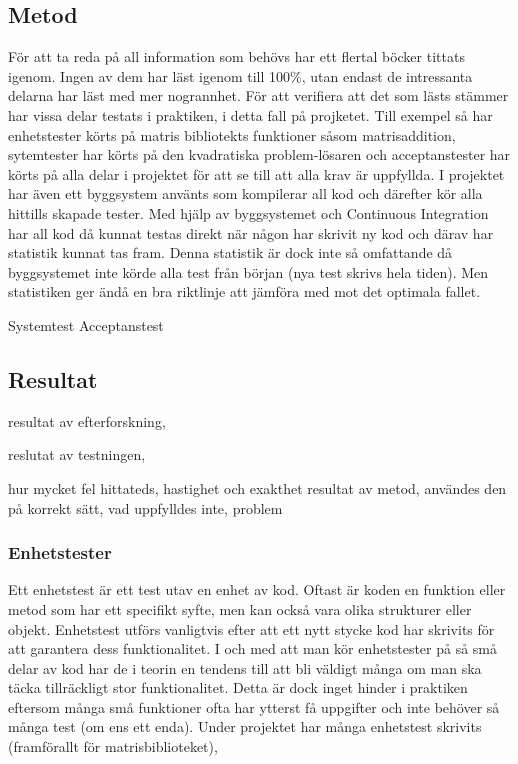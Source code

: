 	\subsection{Metod}
	För att ta reda på all information som behövs har ett flertal böcker tittats igenom. Ingen av dem har läst igenom till 100\%, utan endast de intressanta delarna har läst med mer nogrannhet. För att verifiera att det som lästs stämmer har vissa delar testats i praktiken, i detta fall på projketet. Till exempel så har enhetstester körts på matris bibliotekts funktioner såsom matrisaddition, sytemtester har körts på den kvadratiska problem-lösaren och acceptanstester har körts på alla delar i projektet för att se till att alla krav är uppfyllda.\newline
	I projektet har även ett byggsystem använts som kompilerar all kod och därefter kör alla hittills skapade tester. Med hjälp av byggsystemet och Continuous Integration har all kod då kunnat testas direkt när någon har skrivit ny kod och därav har statistik kunnat tas fram. Denna statistik är dock inte så omfattande då byggsystemet inte körde alla test från början (nya test skrivs hela tiden). Men statistiken ger ändå en bra riktlinje att jämföra med mot det optimala fallet.
	
	Systemtest
	Acceptanstest
	
	
	
	\subsection{Resultat}	
	resultat av efterforskning, \newline
	
	reslutat av testningen, \newline
	
	
	hur mycket fel hittateds, \newline
	hastighet och exakthet\newline
	resultat av metod, \newline
	användes den på korrekt sätt, \newline
	vad uppfylldes inte, \newline
	problem\newline
	
	\subsubsection{Enhetstester}
	Ett enhetstest är ett test utav en enhet av kod. Oftast är koden en funktion eller metod som har ett specifikt syfte, men kan också vara olika strukturer eller objekt. Enhetstest utförs vanligtvis efter att ett nytt stycke kod har skrivits för att garantera dess funktionalitet. I och med att man kör enhetstester på så små delar av kod har de i teorin en tendens till att bli väldigt många om man ska täcka tillräckligt stor funktionalitet. Detta är dock inget hinder i praktiken eftersom många små funktioner ofta har ytterst få uppgifter och inte behöver så många test (om ens ett enda). \newline
	Under projektet har många enhetstest skrivits (framförallt för matrisbiblioteket), 
